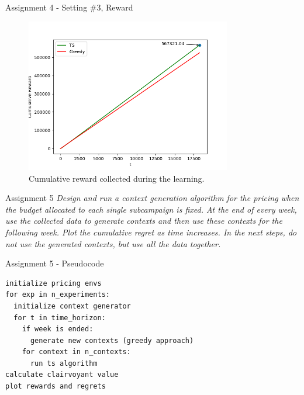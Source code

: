 \documentclass[11pt]{beamer}
\begin{document}
\begin{frame}{Assignment 4 - Setting \#3, Reward}
\begin{figure}[hbtp]
\centering
\includegraphics[width=0.8\textwidth]{images/assignment_4_exp_3_cum_reward.png}
\caption{Cumulative reward collected during the learning.}
\end{figure}
\end{frame}

\begin{frame}{Assignment 5}
\textit{Design and run a context generation algorithm for the pricing when the budget allocated to each single subcampaign is fixed. At the end of every week, use the collected data to generate contexts and then use these contexts for the following week. Plot the cumulative regret as time increases. In the next steps, do not use the generated contexts, but use all the data together.}
\end{frame}

\begin{frame}[fragile]{Assignment 5 - Pseudocode}
\begin{lstlisting}
initialize pricing envs
for exp in n_experiments:
  initialize context generator 
  for t in time_horizon:
    if week is ended:
      generate new contexts (greedy approach)
    for context in n_contexts:
      run ts algorithm
calculate clairvoyant value
plot rewards and regrets
\end{lstlisting}
\end{frame}
\end{document}
